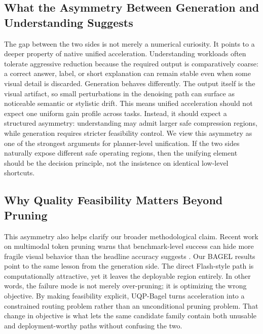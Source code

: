 \documentclass{article}
\begin{document}
\subsection{What the Asymmetry Between Generation and Understanding Suggests}
The gap between the two sides is not merely a numerical curiosity. It points to a deeper property of native unified acceleration. Understanding workloads often tolerate aggressive reduction because the required output is comparatively coarse: a correct answer, label, or short explanation can remain stable even when some visual detail is discarded. Generation behaves differently. The output itself is the visual artifact, so small perturbations in the denoising path can surface as noticeable semantic or stylistic drift. This means unified acceleration should not expect one uniform gain profile across tasks. Instead, it should expect a structured asymmetry: understanding may admit larger safe compression regions, while generation requires stricter feasibility control. We view this asymmetry as one of the strongest arguments for planner-level unification. If the two sides naturally expose different safe operating regions, then the unifying element should be the decision principle, not the insistence on identical low-level shortcuts.

\subsection{Why Quality Feasibility Matters Beyond Pruning}
This asymmetry also helps clarify our broader methodological claim. Recent work on multimodal token pruning warns that benchmark-level success can hide more fragile visual behavior than the headline accuracy suggests \citep{tokenpruning}. Our BAGEL results point to the same lesson from the generation side. The direct Flash-style path is computationally attractive, yet it leaves the deployable region entirely. In other words, the failure mode is not merely over-pruning; it is optimizing the wrong objective. By making feasibility explicit, UQP-Bagel turns acceleration into a constrained routing problem rather than an unconditional pruning problem. That change in objective is what lets the same candidate family contain both unusable and deployment-worthy paths without confusing the two.
\end{document}
